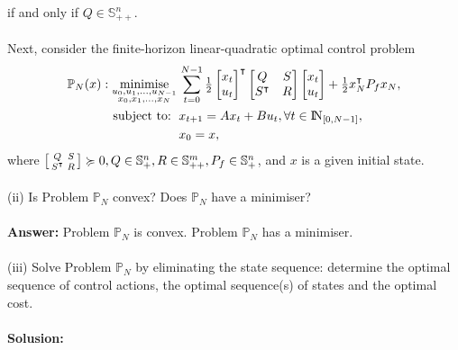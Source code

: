 \documentclass[a4paper,11pt,reqno]{amsart}
\newcommand{\N}{{\rm I\!N}}
\newcommand{\tran}{\intercal}
\DeclareMathOperator*{\minimise}{minimise}
\begin{document}
if and only if $Q\in \mathbb{S}^n_{++}$.
\\ \\
Next, consider the finite-horizon linear-quadratic optimal control problem
\begin{subequations}
    \begin{align}
        \mathbb{P}_N(x): \minimise_{\substack{u_0,u_1,\ldots,u_{N-1}\\ x_0,x_1,\ldots,x_N}} \,
         & \sum_{t=0}^{N-1}\textstyle\frac{1}{2}
         \begin{bmatrix}
             x_t\\
             u_t
         \end{bmatrix}^{\tran}
         \begin{bmatrix}
             Q&S\\
             S^{\tran}&R
         \end{bmatrix}
         \begin{bmatrix}
             x_t\\
             u_t
         \end{bmatrix}
         +\frac{1}{2}x_N^{\tran}P_fx_N,
        \\
        \text{subject to: }\,
         & x_{t+1} = A x_t + B u_t, \forall t\in\N_{[0, N-1]},
        \\
         & x_{0} = x,
    \end{align}
\end{subequations}
where $\begin{bsmallmatrix}Q&S\\S^{\tran}&R\end{bsmallmatrix}\succcurlyeq 0, Q\in \mathbb{S}^n_+, R\in \mathbb{S}^m_{++}, P_f\in \mathbb{S}^n_{+}$, and $x$ is a given initial state.
\\ \\
(ii) Is Problem $\mathbb{P}_N$ convex? Does $\mathbb{P}_N$ have a minimiser?
\\ \\
\textbf{Answer:} Problem $\mathbb{P}_N$ is convex. Problem $\mathbb{P}_N$ has a minimiser.
\\ \\
(iii) Solve Problem $\mathbb{P}_N$ by eliminating the state sequence: determine the optimal sequence of control actions, the optimal sequence(s) of states and the optimal cost.
\\ \\
\textbf{Solusion:}
\\ \\
\end{document}
